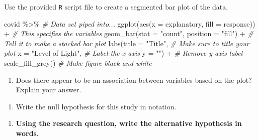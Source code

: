 \documentclass[
]{report}
\newenvironment{Shaded}{\begin{snugshade}}{\end{snugshade}}
\newcommand{\AttributeTok}[1]{\textcolor[rgb]{0.77,0.63,0.00}{#1}}
\newcommand{\CommentTok}[1]{\textcolor[rgb]{0.56,0.35,0.01}{\textit{#1}}}
\newcommand{\FunctionTok}[1]{\textcolor[rgb]{0.00,0.00,0.00}{#1}}
\newcommand{\NormalTok}[1]{#1}
\newcommand{\SpecialCharTok}[1]{\textcolor[rgb]{0.00,0.00,0.00}{#1}}
\newcommand{\StringTok}[1]{\textcolor[rgb]{0.31,0.60,0.02}{#1}}
\providecommand{\tightlist}{%
  \setlength{\itemsep}{0pt}\setlength{\parskip}{0pt}}
\begin{document}
\vspace{0.8in}

Use the provided \texttt{R} script file to create a segmented bar plot of the data.

\begin{Shaded}
\begin{Highlighting}[]
\NormalTok{covid }\SpecialCharTok{\%\textgreater{}\%} \CommentTok{\# Data set piped into...}
\FunctionTok{ggplot}\NormalTok{(}\FunctionTok{aes}\NormalTok{(}\AttributeTok{x =}\NormalTok{ explanatory, }\AttributeTok{fill =}\NormalTok{ response)) }\SpecialCharTok{+}   \CommentTok{\# This specifies the variables}
  \FunctionTok{geom\_bar}\NormalTok{(}\AttributeTok{stat =} \StringTok{"count"}\NormalTok{, }\AttributeTok{position =} \StringTok{"fill"}\NormalTok{) }\SpecialCharTok{+}  \CommentTok{\# Tell it to make a stacked bar plot}
  \FunctionTok{labs}\NormalTok{(}\AttributeTok{title =} \StringTok{"Title"}\NormalTok{,  }\CommentTok{\# Make sure to title your plot }
       \AttributeTok{x =} \StringTok{"Level of Light"}\NormalTok{,   }\CommentTok{\# Label the x axis}
       \AttributeTok{y =} \StringTok{""}\NormalTok{) }\SpecialCharTok{+}  \CommentTok{\# Remove y axis label}
    \FunctionTok{scale\_fill\_grey}\NormalTok{()  }\CommentTok{\# Make figure black and white}
\end{Highlighting}
\end{Shaded}

\begin{enumerate}
\def\labelenumi{\arabic{enumi}.}
\setcounter{enumi}{6}
\tightlist
\item
  Does there appear to be an association between variables based on the plot? Explain your answer.
\end{enumerate}

\vspace{1in}

\begin{enumerate}
\def\labelenumi{\arabic{enumi}.}
\setcounter{enumi}{7}
\tightlist
\item
  Write the null hypothesis for this study in notation.
\end{enumerate}

\vspace{0.5in}
\newpage

\begin{enumerate}
\def\labelenumi{\arabic{enumi}.}
\setcounter{enumi}{8}
\tightlist
\item
  \textbf{Using the research question, write the alternative hypothesis in words.}
\end{enumerate}
\end{document}

